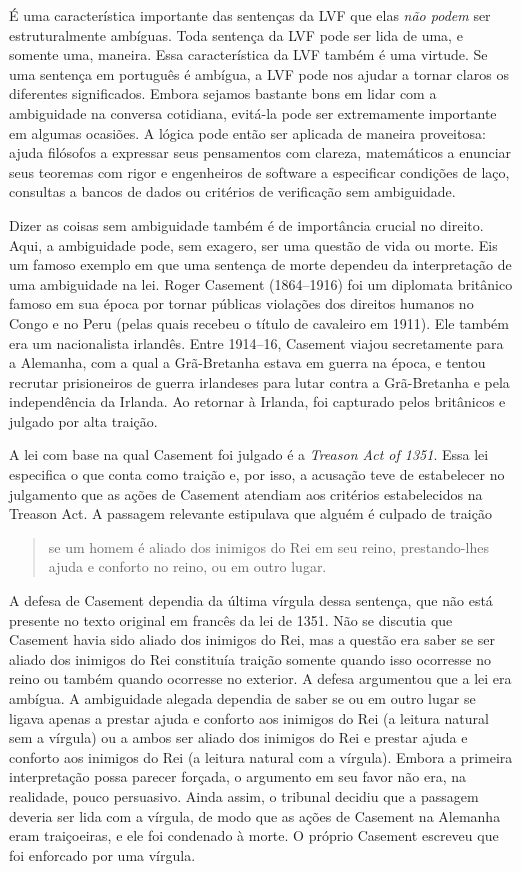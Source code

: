 É uma característica importante das sentenças da LVF que elas
\emph{não podem} ser estruturalmente ambíguas. Toda sentença da LVF pode
ser lida de uma, e somente uma, maneira. Essa característica da LVF
também é uma virtude. Se uma sentença em português é ambígua, a LVF pode
nos ajudar a tornar claros os diferentes significados. Embora sejamos
bastante bons em lidar com a ambiguidade na conversa cotidiana, evitá-la
pode ser extremamente importante em algumas ocasiões. A lógica pode então
ser aplicada de maneira proveitosa: ajuda filósofos a expressar seus
pensamentos com clareza, matemáticos a enunciar seus teoremas com rigor e
engenheiros de software a especificar condições de laço, consultas a
bancos de dados ou critérios de verificação sem ambiguidade.

Dizer as coisas sem ambiguidade também é de importância crucial no
direito. Aqui, a ambiguidade pode, sem exagero, ser uma questão de vida
ou morte. Eis um famoso exemplo em que uma sentença de morte dependeu da
interpretação de uma ambiguidade na lei. Roger Casement (1864--1916) foi
um diplomata britânico famoso em sua época por tornar públicas violações
dos direitos humanos no Congo e no Peru (pelas quais recebeu o título de
cavaleiro em 1911). Ele também era um nacionalista irlandês. Entre
1914--16, Casement viajou secretamente para a Alemanha, com a qual a
Grã-Bretanha estava em guerra na época, e tentou recrutar prisioneiros de
guerra irlandeses para lutar contra a Grã-Bretanha e pela independência
da Irlanda. Ao retornar à Irlanda, foi capturado pelos britânicos e
julgado por alta traição.

A lei com base na qual Casement foi julgado é a
\textit{Treason Act of 1351}. Essa lei especifica o que conta como
traição e, por isso, a acusação teve de estabelecer no julgamento que as
ações de Casement atendiam aos critérios estabelecidos na Treason Act. A
passagem relevante estipulava que alguém é culpado de traição
\begin{quote}
	se um homem é aliado dos inimigos do Rei em seu
	reino, prestando-lhes ajuda e conforto no reino, ou em outro lugar.
\end{quote}
A defesa de Casement dependia da última vírgula dessa sentença, que não
está presente no texto original em francês da lei de 1351. Não se
discutia que Casement havia sido aliado dos inimigos do Rei, mas a
questão era saber se ser aliado dos inimigos do Rei constituía traição
somente quando isso ocorresse no reino ou também quando ocorresse no
exterior. A defesa argumentou que a lei era ambígua. A ambiguidade alegada
dependia de saber se ou em outro lugar se ligava apenas a
prestar ajuda e conforto aos inimigos do Rei (a leitura natural
sem a vírgula) ou a ambos ser aliado dos inimigos do Rei e
prestar ajuda e conforto aos inimigos do Rei (a leitura natural
com a vírgula). Embora a primeira interpretação possa parecer forçada, o
argumento em seu favor não era, na realidade, pouco persuasivo. Ainda
assim, o tribunal decidiu que a passagem deveria ser lida com a vírgula,
de modo que as ações de Casement na Alemanha eram traiçoeiras, e ele foi
condenado à morte. O próprio Casement escreveu que foi
enforcado por uma vírgula.

